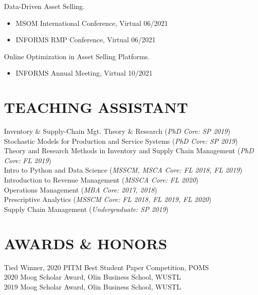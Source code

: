 \documentclass[margin, 10pt]{res} %
\begin{document}
\begin{resume}
Data-Driven Asset Selling.

\begin{itemize}
    \item MSOM International Conference, Virtual \hfill 06/2021
    \item INFORMS RMP Conference, Virtual \hfill 06/2021
\end{itemize}

Online Optimization in Asset Selling Platforms.
\begin{itemize}
    \item INFORMS Annual Meeting, Virtual \hfill 10/2021
\end{itemize}

\section{TEACHING ASSISTANT}
Inventory \& Supply-Chain Mgt. Theory \& Research ({\it PhD Core: SP 2019})\\
Stochastic Models for Production and Service Systems ({\it PhD Core: SP 2019})\\
Theory and Research Methods in Inventory and Supply Chain Management ({\it PhD Core: FL 2019})\\
Intro to Python and Data Science ({\it MSSCM, MSCA Core: FL 2018, FL 2019})\\		
Introduction to Revenue Management ({\it MSSCA Core: FL 2020})\\
Operations Management ({\it MBA Core: 2017, 2018})\\
Prescriptive Analytics ({\it MSSCM Core: FL 2018, FL 2019, FL 2020})\\		
Supply Chain Management ({\it Undergraduate: SP 2019})\\


\section{AWARDS \& HONORS} 
Tied Winner, 2020 PITM Best Student Paper Competition, POMS\\
2020 Moog Scholar Award, Olin Business School, WUSTL\\
2019 Moog Scholar Award, Olin Business School, WUSTL\\


\end{resume}
\end{document}
